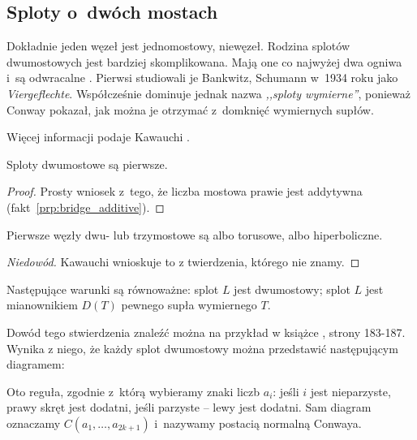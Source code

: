 
\subsection{Sploty o~dwóch mostach}
\label{sub:twobridge}%
%
%
Dokładnie jeden węzeł jest jednomostowy, niewęzeł.
Rodzina splotów dwumostowych jest bardziej skomplikowana.
Mają one co najwyżej dwa ogniwa i~są odwracalne \cite[s. 211]{burde2014}.
Pierwsi studiowali je Bankwitz, Schumann \cite{bankwitz1934} w~1934 roku jako \emph{Viergeflechte}.
Współcześnie dominuje jednak nazwa \emph{,,sploty wymierne''}, ponieważ Conway pokazał, jak można je otrzymać z~domknięć wymiernych supłów.

Więcej informacji podaje Kawauchi \cite[s. 21-26]{kawauchi1996}.

\begin{proposition}
    Sploty dwumostowe są pierwsze.
\end{proposition}

\begin{proof}
    Prosty wniosek z~tego, że liczba mostowa prawie jest addytywna (fakt~\ref{prp:bridge_additive}).
\end{proof}

\begin{corollary}
    Pierwsze węzły dwu- lub trzymostowe są albo torusowe, albo hiperboliczne.
\end{corollary}

\begin{proof}[Niedowód]
    Kawauchi \cite[s. 130]{kawauchi1996} wnioskuje to z twierdzenia, którego nie znamy.
\end{proof}

\begin{proposition}
    Następujące warunki są równoważne: splot $L$ jest dwumostowy; splot $L$ jest mianownikiem $D(T)$ pewnego supła wymiernego $T$.
\end{proposition}

Dowód tego stwierdzenia znaleźć można na przykład w książce \cite{murasugi1996}, strony 183-187.
Wynika z niego, że każdy splot dwumostowy można przedstawić następującym diagramem:


Oto reguła, zgodnie z~którą wybieramy znaki liczb $a_i$:
jeśli $i$ jest nieparzyste, prawy skręt jest dodatni, jeśli parzyste -- lewy jest dodatni.
Sam diagram oznaczamy $C(a_1, \ldots, a_{2k+1})$ i~nazywamy postacią normalną Conwaya.

